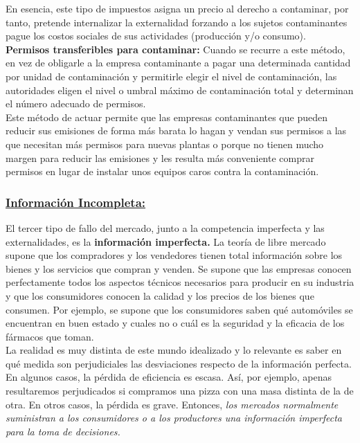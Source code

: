\begin{itemize}
	En esencia, este tipo de impuestos asigna un precio al derecho a contaminar, por tanto, pretende internalizar la externalidad forzando a los sujetos contaminantes pague los costos sociales de sus actividades (producción y/o consumo).\\
	
	\textbf{\textcolor[rgb]{0,0.24,0.5}{Permisos transferibles para contaminar:}} Cuando se recurre a este método, en vez de obligarle a la empresa contaminante a pagar una determinada cantidad por unidad de contaminación y permitirle elegir el nivel de contaminación, las autoridades eligen el nivel o umbral máximo de contaminación total y determinan el número adecuado de permisos.\\
	
	Este método de actuar permite que las empresas contaminantes que pueden reducir sus emisiones de forma más barata lo hagan y vendan sus permisos a las	que necesitan más permisos para nuevas plantas o porque	no tienen mucho margen para reducir las emisiones y les	resulta más conveniente comprar permisos en lugar de instalar unos equipos caros contra la contaminación.\\
	
\end{itemize}


\subsubsection{\textcolor[rgb]{0,0,0.55}{\underline{{\normalsize Información Incompleta:}}}}
El tercer tipo de fallo del mercado, junto a la competencia
imperfecta y las externalidades, es la \textbf{información imperfecta.} La teoría de libre mercado supone que los compradores y los vendedores tienen total información sobre
los bienes y los servicios que compran y venden. Se supone que las empresas conocen perfectamente todos los aspectos técnicos necesarios para producir en su industria y que los consumidores conocen la calidad y los precios de los bienes que consumen. Por ejemplo, se supone que los consumidores saben qué automóviles se encuentran en buen estado y cuales no o cuál es la seguridad y la eficacia de los fármacos que toman. \\

La realidad es muy distinta de este mundo idealizado y lo relevante es saber en qué medida son perjudiciales las desviaciones respecto de la información perfecta. En algunos casos, la pérdida de eficiencia es escasa. Así, por ejemplo, apenas resultaremos perjudicados si compramos una pizza con una masa distinta de la de otra. En otros casos, la pérdida es grave. Entonces, \textit{los mercados normalmente suministran a los consumidores o a los productores una información imperfecta para la toma de decisiones.}\\

